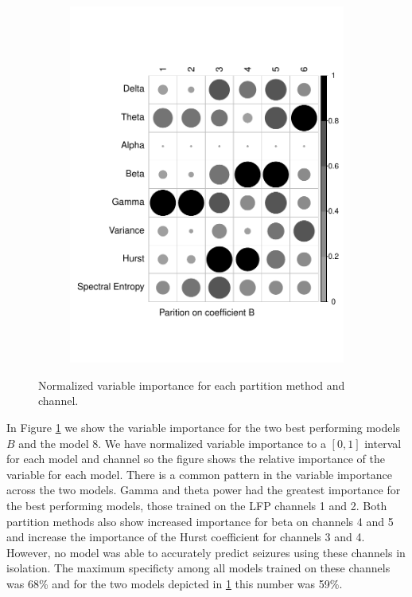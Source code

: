 \begin{figure}[h]
\begin{subfigure}[b]{0.45\textwidth}
    \includegraphics[width = \linewidth, keepaspectratio]{./figs/eeg-AB-corrplot.pdf}%
      \end{subfigure}
  \caption{Normalized variable importance for
     each partition method and channel.}
    \label{fig:corrplot}
\end{figure}

In Figure \ref{fig:corrplot} we show the variable 
importance for the two best performing models $B$ and the 
model $8$. We have normalized variable importance to a $[0,1]$ interval for each model and
channel so the figure shows the relative importance of the variable for each model. There is a common pattern in the variable importance across the two models. Gamma and theta power had the greatest importance for the best performing models, those trained on the LFP channels 1 and 2. Both partition methods also show increased importance for beta on channels 4 and 5 and increase the importance of the Hurst coefficient for channels 3 and 4. However, no model 
was able to accurately predict seizures using these channels 
in isolation. The maximum specificty among all models trained 
on these channels was 68\% and for the two models depicted 
in \ref{fig:corrplot} this number was 59\%. 

